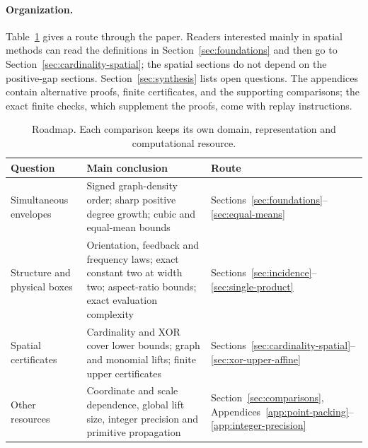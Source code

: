 \documentclass[11pt]{article}
\begin{document}
\paragraph{Organization.}
Table~\ref{tab:roadmap} gives a route through the paper. Readers interested
mainly in spatial methods can read the definitions in
Section~\ref{sec:foundations} and then go to
Section~\ref{sec:cardinality-spatial}; the spatial sections do not depend
on the positive-gap sections. Section~\ref{sec:synthesis} lists open
questions. The appendices contain alternative proofs, finite certificates, and the
supporting comparisons; the exact finite checks, which supplement the
proofs, come with replay instructions.
\begin{table}[htbp]
\centering\small
\begin{tabular}{@{}p{}p{}p{}@{}}
\toprule
Question & Main conclusion & Route \\
\midrule
Simultaneous envelopes & Signed graph-density order; sharp positive
 degree growth; cubic and equal-mean bounds & Sections~\ref{sec:foundations}--\ref{sec:equal-means} \\
Structure and physical boxes & Orientation, feedback and frequency laws;
 exact constant two at width two; aspect-ratio bounds; exact evaluation
 complexity &
 Sections~\ref{sec:incidence}--\ref{sec:single-product} \\
Spatial certificates & Cardinality and XOR cover lower bounds;
 graph and monomial lifts; finite upper certificates &
 Sections~\ref{sec:cardinality-spatial}--\ref{sec:xor-upper-affine} \\
Other resources & Coordinate and scale dependence, global lift size,
 integer precision and primitive propagation &
 Section~\ref{sec:comparisons}, Appendices~\ref{app:point-packing}--\ref{app:integer-precision} \\
\bottomrule
\end{tabular}
\caption{Roadmap. Each comparison keeps its own domain, representation and
computational resource.}\label{tab:roadmap}
\end{table}


















\appendix













\end{document}
